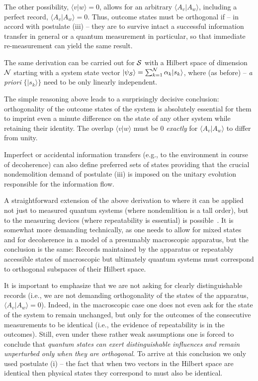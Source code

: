\documentclass[aps,amsmath,amssymb,amsfonts,floatfix]{revtex4-1}
\newcommand{\ket}[1]    {| #1 \rangle}
\newcommand{\bk}[2]     {\langle #1 | #2 \rangle}
\newcommand{\+}         {\dagger}
\begin{document}
The other possibility, $\bk v w = 0$, allows for an arbitrary $\bk {A_v} {A_w}$, including a perfect
record, $\bk {A_v} {A_w}=0$. Thus, outcome states must be orthogonal if -- in accord with postulate (iii) -- they are to survive intact a
successful information transfer in general or a quantum measurement in particular, so that immediate re-measurement can yield the same result.

The same derivation can be carried out for ${\cal S}$ with a Hilbert space of
dimension ${\cal N}$ starting with a system state vector $\ket {\psi_{\cal S}}=\sum_{k=1}^{\cal N}\alpha_k \ket {s_k}$,
where (as before) -- {\it a priori} $\{\ket {s_k} \}$ need to be only linearly independent.

The simple reasoning above leads to a surprisingly decisive conclusion: orthogonality of the outcome states of the system is absolutely
essential for them to imprint even a minute difference on the state of any other system while retaining their
identity. The overlap $\bk v  w$ must be 0 {\it exactly} for $\bk {A_v} {A_w}$ to differ from unity. 

Imperfect or accidental information transfers (e.g., to the environment in course of decoherence) can also define
preferred sets of states providing that the crucial nondemolition demand of postulate (iii) is imposed on the unitary evolution responsible for the information flow.

A straightforward extension of the above derivation to where it can be applied not just to measured quantum systems (where nondemlition is a tall order), but to the measuring devices (where repeatability is essential) is possible~\cite{79,Z2013}. It is somewhat more demanding technically, as one needs to allow for mixed states and for decoherence in a model of a presumably macroscopic apparatus, but the conclusion is the same: Records maintained by the apparatus or repeatably accessible states of macroscopic but ultimately quantum systems must correspond to orthogonal subspaces of their Hilbert space.

It is important to emphasize that we are not asking for clearly distinguishable records (i.e., we are not demanding orthogonality of the states of the apparatus, $\bk {A_v} {A_w}=0$). 
Indeed, in the macroscopic case \cite{Z2013} one does not even ask for the state of the system to remain unchanged, but only for the outcomes of the consecutive measurements to be identical (i.e., the evidence of repeatability is in the outcomes). Still, even under these rather weak assumptions one is forced to conclude that {\it quantum states can exert distinguishable influences and remain unperturbed only when they are orthogonal}. To arrive at this conclusion we only used postulate (i) --
the fact that when two vectors in the Hilbert space are identical then physical states they correspond
to must also be identical.
\end{document}
